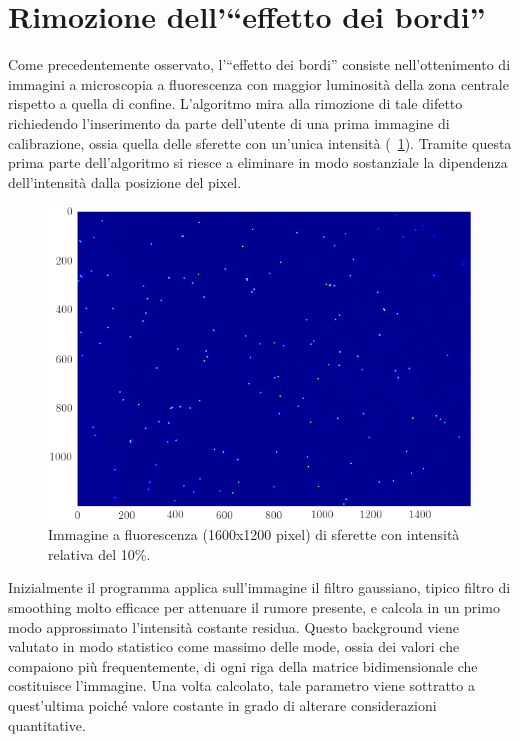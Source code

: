 \section{Rimozione dell'``effetto dei bordi''}

Come precedentemente osservato, l'``effetto dei bordi'' consiste nell'ottenimento di immagini a microscopia a fluorescenza con maggior luminosità della zona centrale rispetto a quella di confine. 
L'algoritmo mira alla rimozione di tale difetto richiedendo l'inserimento da parte dell'utente di una prima immagine di calibrazione, ossia quella delle sferette con un'unica intensità (\figurename~\ref{fig:unaint}).
Tramite questa prima parte dell'algoritmo si riesce a eliminare in modo sostanziale la dipendenza dell'intensità dalla posizione del pixel. 

\begin{figure}
 \centering
 \includegraphics[scale=.64]{img/CAP3unaint.png}
 \caption{\small{Immagine a fluorescenza (1600x1200 pixel) di sferette con intensità relativa del 10\%.}}
 \label{fig:unaint}
\end{figure}

Inizialmente il programma applica sull'immagine il filtro gaussiano, tipico filtro di smoothing molto efficace per attenuare il rumore presente, e calcola in un primo modo approssimato l'intensità costante residua.
Questo background viene valutato in modo statistico come massimo delle mode, ossia dei valori che compaiono più frequentemente, di ogni riga della matrice bidimensionale che costituisce l'immagine. 
Una volta calcolato, tale parametro viene sottratto a quest'ultima poiché valore costante in grado di alterare considerazioni quantitative.

